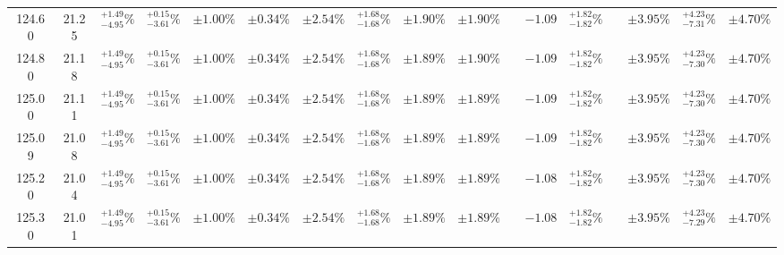 \begin{landscape}
\begin{table}[ht!]
{\begin{tabular}{| cc | cccc | ccc | c |@{}c@{\;}| cc |@{}c@{\;}| ccc |}
124.60 & 21.25 & \({}^{ +1.49}_{ -4.95}\%\) & {\color{black!55}\({}^{ +0.15}_{ -3.61}\%\)} & {\color{black!55}\(\pm{  1.00}\%\)} & {\color{black!55}\(\pm{  0.34}\%\)} & \(\pm 2.54\%\) & {\color{black!55}\({}^{ +1.68}_{ -1.68}\%\)} & {\color{black!55}\(\pm 1.90\%\)} & \(\pm{  1.90}\%\) &  & \(-1.09\) & \({}^{ +1.82}_{ -1.82}\%\) &  & \(\pm 3.95\%\) & \({}^{ +4.23}_{ -7.31}\%\) & \(\pm 4.70\%\)\\
124.80 & 21.18 & \({}^{ +1.49}_{ -4.95}\%\) & {\color{black!55}\({}^{ +0.15}_{ -3.61}\%\)} & {\color{black!55}\(\pm{  1.00}\%\)} & {\color{black!55}\(\pm{  0.34}\%\)} & \(\pm 2.54\%\) & {\color{black!55}\({}^{ +1.68}_{ -1.68}\%\)} & {\color{black!55}\(\pm 1.89\%\)} & \(\pm{  1.90}\%\) &  & \(-1.09\) & \({}^{ +1.82}_{ -1.82}\%\) &  & \(\pm 3.95\%\) & \({}^{ +4.23}_{ -7.30}\%\) & \(\pm 4.70\%\)\\
125.00 & 21.11 & \({}^{ +1.49}_{ -4.95}\%\) & {\color{black!55}\({}^{ +0.15}_{ -3.61}\%\)} & {\color{black!55}\(\pm{  1.00}\%\)} & {\color{black!55}\(\pm{  0.34}\%\)} & \(\pm 2.54\%\) & {\color{black!55}\({}^{ +1.68}_{ -1.68}\%\)} & {\color{black!55}\(\pm 1.89\%\)} & \(\pm{  1.89}\%\) &  & \(-1.09\) & \({}^{ +1.82}_{ -1.82}\%\) &  & \(\pm 3.95\%\) & \({}^{ +4.23}_{ -7.30}\%\) & \(\pm 4.70\%\)\\
125.09 & 21.08 & \({}^{ +1.49}_{ -4.95}\%\) & {\color{black!55}\({}^{ +0.15}_{ -3.61}\%\)} & {\color{black!55}\(\pm{  1.00}\%\)} & {\color{black!55}\(\pm{  0.34}\%\)} & \(\pm 2.54\%\) & {\color{black!55}\({}^{ +1.68}_{ -1.68}\%\)} & {\color{black!55}\(\pm 1.89\%\)} & \(\pm{  1.89}\%\) &  & \(-1.09\) & \({}^{ +1.82}_{ -1.82}\%\) &  & \(\pm 3.95\%\) & \({}^{ +4.23}_{ -7.30}\%\) & \(\pm 4.70\%\)\\
125.20 & 21.04 & \({}^{ +1.49}_{ -4.95}\%\) & {\color{black!55}\({}^{ +0.15}_{ -3.61}\%\)} & {\color{black!55}\(\pm{  1.00}\%\)} & {\color{black!55}\(\pm{  0.34}\%\)} & \(\pm 2.54\%\) & {\color{black!55}\({}^{ +1.68}_{ -1.68}\%\)} & {\color{black!55}\(\pm 1.89\%\)} & \(\pm{  1.89}\%\) &  & \(-1.08\) & \({}^{ +1.82}_{ -1.82}\%\) &  & \(\pm 3.95\%\) & \({}^{ +4.23}_{ -7.30}\%\) & \(\pm 4.70\%\)\\
125.30 & 21.01 & \({}^{ +1.49}_{ -4.95}\%\) & {\color{black!55}\({}^{ +0.15}_{ -3.61}\%\)} & {\color{black!55}\(\pm{  1.00}\%\)} & {\color{black!55}\(\pm{  0.34}\%\)} & \(\pm 2.54\%\) & {\color{black!55}\({}^{ +1.68}_{ -1.68}\%\)} & {\color{black!55}\(\pm 1.89\%\)} & \(\pm{  1.89}\%\) &  & \(-1.08\) & \({}^{ +1.82}_{ -1.82}\%\) &  & \(\pm 3.95\%\) & \({}^{ +4.23}_{ -7.29}\%\) & \(\pm 4.70\%\)\\

\end{tabular}}
\end{table}
\end{landscape}

